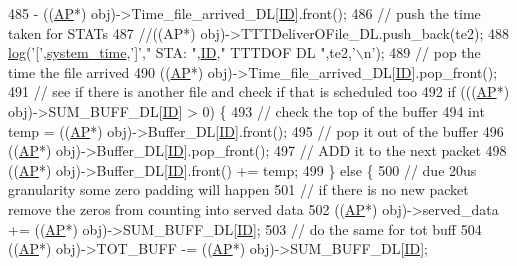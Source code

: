 \begin{DoxyCode}
485                         - ((\hyperlink{classAP}{AP}*) obj)->Time\_file\_arrived\_DL[\hyperlink{classSTA_a9376abb50969b5b16aeb5fb0e449e6f7}{ID}].front();
486                 \textcolor{comment}{// push the time taken for STATs}
487                 \textcolor{comment}{//((AP*) obj)->TTTDeliverOFile\_DL.push\_back(te2);}
488                 \hyperlink{STA_8cpp_aa5af53510557e77a03906c5016ebe66f}{log}(\textcolor{charliteral}{'['},\hyperlink{STA_8cpp_aaa03a568dc1d9d3391286ea24b9cfb63}{system\_time},\textcolor{charliteral}{']'},\textcolor{stringliteral}{" STA: "},\hyperlink{classSTA_a9376abb50969b5b16aeb5fb0e449e6f7}{ID},\textcolor{stringliteral}{" TTTDOF DL "},te2,\textcolor{charliteral}{'\(\backslash\)n'});
489                 \textcolor{comment}{// pop the time the file arrived}
490                 ((\hyperlink{classAP}{AP}*) obj)->Time\_file\_arrived\_DL[\hyperlink{classSTA_a9376abb50969b5b16aeb5fb0e449e6f7}{ID}].pop\_front();
491                 \textcolor{comment}{// see if there is another file and check if that is scheduled too}
492                 \textcolor{keywordflow}{if} (((\hyperlink{classAP}{AP}*) obj)->SUM\_BUFF\_DL[\hyperlink{classSTA_a9376abb50969b5b16aeb5fb0e449e6f7}{ID}] > 0) \{
493                     \textcolor{comment}{// check the top of the buffer}
494                     \textcolor{keywordtype}{int} temp = ((\hyperlink{classAP}{AP}*) obj)->Buffer\_DL[\hyperlink{classSTA_a9376abb50969b5b16aeb5fb0e449e6f7}{ID}].front();
495                     \textcolor{comment}{// pop it out of the buffer}
496                     ((\hyperlink{classAP}{AP}*) obj)->Buffer\_DL[\hyperlink{classSTA_a9376abb50969b5b16aeb5fb0e449e6f7}{ID}].pop\_front();
497                     \textcolor{comment}{// ADD it to the next packet}
498                     ((\hyperlink{classAP}{AP}*) obj)->Buffer\_DL[\hyperlink{classSTA_a9376abb50969b5b16aeb5fb0e449e6f7}{ID}].front() += temp;
499                 \} \textcolor{keywordflow}{else} \{
500                     \textcolor{comment}{// due 20us granularity some zero padding will happen}
501                     \textcolor{comment}{// if there is no new packet remove the zeros from counting into served data}
502                     ((\hyperlink{classAP}{AP}*) obj)->served\_data += ((\hyperlink{classAP}{AP}*) obj)->SUM\_BUFF\_DL[\hyperlink{classSTA_a9376abb50969b5b16aeb5fb0e449e6f7}{ID}];
503                     \textcolor{comment}{// do the same for tot buff}
504                     ((\hyperlink{classAP}{AP}*) obj)->TOT\_BUFF -= ((\hyperlink{classAP}{AP}*) obj)->SUM\_BUFF\_DL[\hyperlink{classSTA_a9376abb50969b5b16aeb5fb0e449e6f7}{ID}];

\end{DoxyCode}
